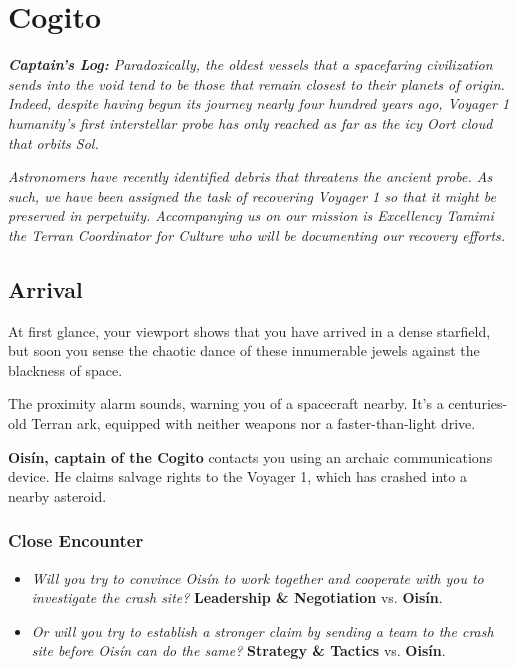 \documentclass[11pt, a5paper, parskip=half-, DIV=12]{scrartcl}
\begin{document}
\section*{Cogito}
\textit{\textbf{Captain's Log:} Paradoxically, the oldest vessels that a spacefaring civilization sends into the void tend to be those that remain closest to their planets of origin. Indeed, despite having begun its journey nearly four hundred years ago, Voyager 1 \textemdash{} humanity's first interstellar probe \textemdash{} has only reached as far as the icy Oort cloud that orbits Sol.}

\textit{Astronomers have recently identified debris that threatens the ancient probe. As such, we have been assigned the task of recovering Voyager 1 so that it might be preserved in perpetuity. Accompanying us on our mission is Excellency Tamimi \textemdash{} the Terran Coordinator for Culture \textemdash{} who will be documenting our recovery efforts.}

\subsection*{Arrival}
At first glance, your viewport shows that you have arrived in a dense starfield, but soon you sense the chaotic dance of these innumerable jewels against the blackness of space.

The proximity alarm sounds, warning you of a spacecraft nearby. It's a centuries-old Terran ark, equipped with neither weapons nor a faster-than-light drive. 

\textbf{Ois\'in, captain of the Cogito} contacts you using an archaic communications device. He claims salvage rights to the Voyager 1, which has crashed into a nearby asteroid.

\subsubsection*{Close Encounter}
\begin{itemize}
	\item \textit{Will you try to convince Ois\'in to work together and cooperate with you to investigate the crash site?} \textbf{Leadership \& Negotiation} vs. \textbf{Ois\'in}.
	\item \textit{Or will you try to establish a stronger claim by sending a team to the crash site before Ois\'in can do the same?} \textbf{Strategy \& Tactics} vs. \textbf{Ois\'in}. 
\end{itemize}
\end{document}
